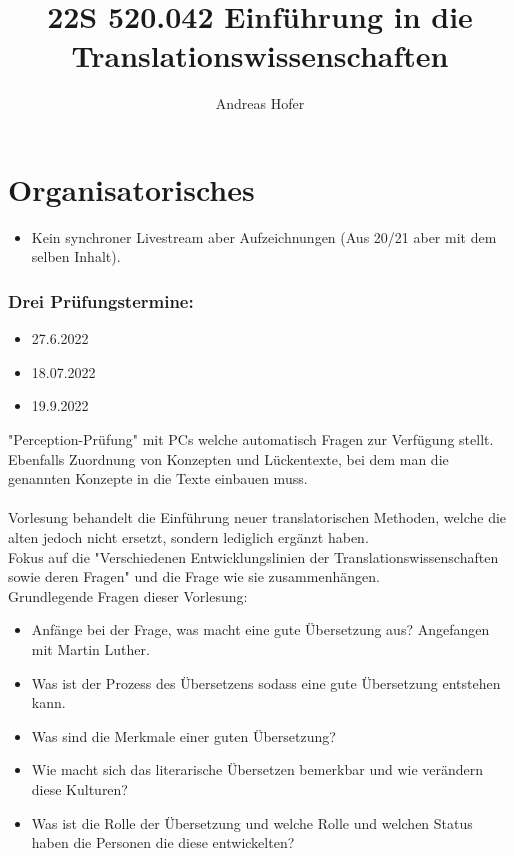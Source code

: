 \documentclass{article}
\title{22S 520.042 Einführung in die Translationswissenschaften}
\author{Andreas Hofer}
\begin{document}
	\maketitle
	\section*{Organisatorisches}
	\begin{itemize}
		\item{Kein synchroner Livestream aber Aufzeichnungen  (Aus 20/21 aber mit dem selben Inhalt).}
	\end{itemize}
	\subsubsection*{Drei Prüfungstermine:}
	\begin{itemize}
		\item{27.6.2022}
		\item{18.07.2022}
		\item{19.9.2022}
	\end{itemize}
	"Perception-Prüfung" mit PCs welche automatisch Fragen zur Verfügung stellt. Ebenfalls Zuordnung von Konzepten und Lückentexte, bei dem man die genannten Konzepte in die Texte einbauen muss. \\ \\
	Vorlesung behandelt die Einführung neuer translatorischen Methoden, welche die alten jedoch nicht ersetzt, sondern lediglich ergänzt haben. \\
	Fokus auf die "Verschiedenen Entwicklungslinien der Translationswissenschaften sowie deren Fragen" und die Frage wie sie zusammenhängen. \\
	Grundlegende Fragen dieser Vorlesung:
	\begin{itemize}
		\item{Anfänge bei der Frage, was macht eine gute Übersetzung aus? Angefangen mit Martin Luther.}
		\item{Was ist der Prozess des Übersetzens sodass eine gute Übersetzung entstehen kann.}
		\item{Was sind die Merkmale einer guten Übersetzung?}
		\item{Wie macht sich das literarische Übersetzen bemerkbar und wie verändern diese Kulturen?}
		\item{Was ist die Rolle der Übersetzung und welche Rolle und welchen Status haben die Personen die diese entwickelten?}
	\end{itemize}

	\newpage
\end{document}

